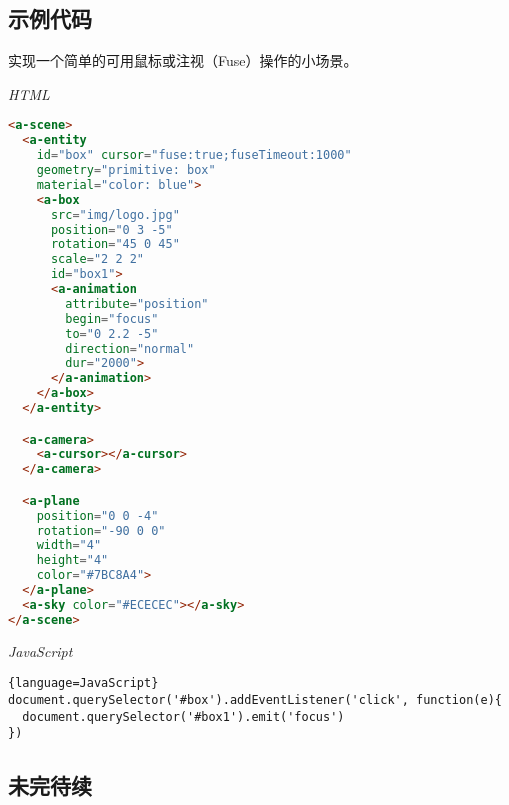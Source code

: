 \subsection{示例代码}
实现一个简单的可用鼠标或注视（Fuse）操作的小场景。


\emph{HTML}
\begin{lstlisting}[language=HTML]
<a-scene>
  <a-entity
    id="box" cursor="fuse:true;fuseTimeout:1000"
    geometry="primitive: box"
    material="color: blue">
    <a-box
      src="img/logo.jpg"
      position="0 3 -5"
      rotation="45 0 45"
      scale="2 2 2"
      id="box1">
      <a-animation
        attribute="position"
        begin="focus"
        to="0 2.2 -5"
        direction="normal"
        dur="2000">
      </a-animation>
    </a-box>
  </a-entity>

  <a-camera>
    <a-cursor></a-cursor>
  </a-camera>

  <a-plane 
    position="0 0 -4" 
    rotation="-90 0 0" 
    width="4" 
    height="4" 
    color="#7BC8A4">
  </a-plane>
  <a-sky color="#ECECEC"></a-sky>
</a-scene>
\end{lstlisting} 

\emph{JavaScript}
\begin{lstlisting}{language=JavaScript}
document.querySelector('#box').addEventListener('click', function(e){
  document.querySelector('#box1').emit('focus')
})
\end{lstlisting}

\subsection{未完待续}
